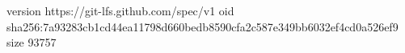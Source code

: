 version https://git-lfs.github.com/spec/v1
oid sha256:7a93283cb1cd44ea11798d660bedb8590cfa2c587e349bb6032ef4cd0a526ef9
size 93757
